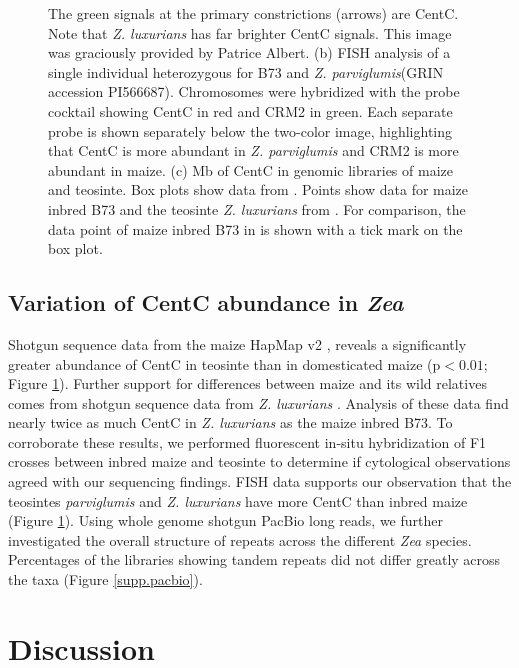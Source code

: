 \begin{figure}
{The green signals at the primary constrictions (arrows) are CentC.
Note that \emph{Z. luxurians} has far brighter CentC signals.
This image was graciously provided by Patrice Albert.
(b) FISH analysis of a single individual heterozygous for B73 and \emph{Z. parviglumis}(GRIN accession PI566687).
Chromosomes were hybridized with the \citet{Shi2010} probe cocktail showing CentC in red and CRM2 in green. 
Each separate probe is shown separately below the two-color image, highlighting that CentC is more abundant in \emph{Z. parviglumis} and CRM2 is more abundant in maize. 
(c) Mb of CentC in genomic libraries of maize and teosinte. 
Box plots show data from \citet{Chia2012}. 
Points show data for maize inbred B73 and the teosinte \emph{Z. luxurians} from \citet{Tenaillon2011}. For comparison, the data point of maize inbred B73 in \citet{Chia2012} is shown with a tick mark on the box plot.
}
\label{abundance}    
\end{figure}

\subsection*{Variation of CentC abundance in \emph{Zea}}

Shotgun sequence data from the maize HapMap v2 \citep{Chia2012}, reveals a significantly greater abundance of CentC in teosinte than in domesticated maize (p$<0.01$; Figure \ref{abundance}).   
Further support for differences between maize and its wild relatives comes from shotgun sequence data from \emph{Z. luxurians} \citep{Tenaillon2011}.  
Analysis of these data find nearly twice as much CentC in \emph{Z. luxurians} as the maize inbred B73.  
To corroborate these results, we performed fluorescent in-situ hybridization of F1 crosses between inbred maize and teosinte to determine if cytological observations agreed with our sequencing findings.   
FISH data supports our observation that the teosintes \emph{parviglumis} and \emph{Z. luxurians} have more CentC than inbred maize (Figure \ref{abundance}).  Using whole genome shotgun PacBio long reads, we further investigated the overall structure of repeats across the different \emph{Zea} species.  Percentages of the libraries showing tandem repeats did not differ greatly across the taxa (Figure \ref{supp.pacbio}).

\section*{Discussion}
\label{discussion}

